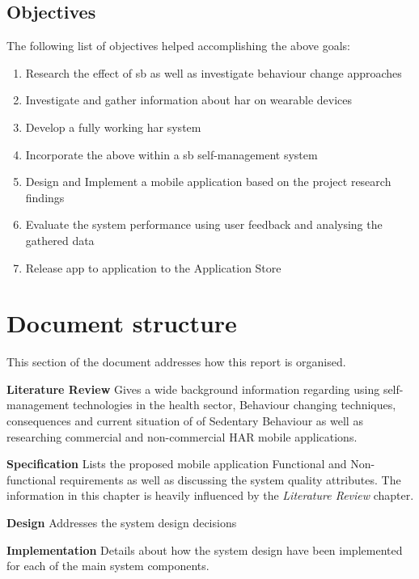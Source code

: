    \subsection*{Objectives}
    The following list of objectives helped accomplishing the above goals: 
    \begin{enumerate}
        \item Research the effect of \gls{sb} as well as investigate behaviour change approaches
        \item Investigate and gather information about \gls{har} on wearable devices
        \item Develop a fully working \gls{har} system
        \item Incorporate the above within a \gls{sb} self-management system
        \item  Design and Implement a mobile application based on the project research findings
        \item Evaluate the system performance using user feedback and analysing the gathered data
        \item Release app to application to the Application Store 
    \end{enumerate}
    
    \section{Document structure}
    This section of the document addresses how this report is organised.\newline
    
    \textbf{Literature Review} Gives a wide background information regarding using self-management technologies in the health sector, Behaviour changing techniques, consequences and current situation of of Sedentary Behaviour as well as researching commercial and non-commercial HAR mobile applications.\newline
    
    
    \textbf{Specification} Lists the proposed mobile application Functional and Non-functional requirements as well as discussing the system quality attributes. The information in this chapter is heavily influenced by the \textit{Literature Review} chapter.\newline
    
    
    \textbf{Design} Addresses the system design decisions\newline
    
    
    \textbf{Implementation} Details about how the system design have been implemented for each of the main system components.\newline
    
